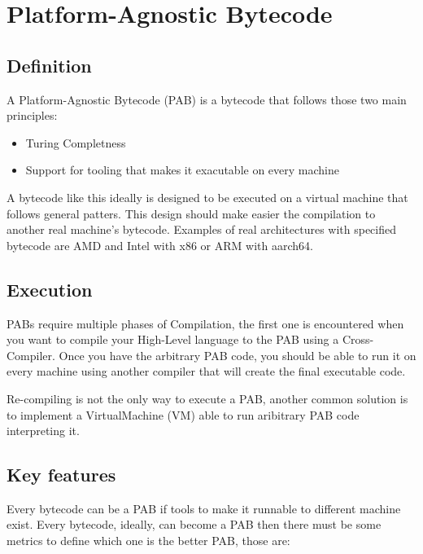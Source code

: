\documentclass[../main.tex]{subfiles}
\begin{document}
\section{Platform-Agnostic Bytecode}
\subsection{Definition}

A Platform-Agnostic Bytecode (PAB) is a bytecode that follows those two main principles:

\begin{itemize}
    \item Turing Completness
    \item Support for tooling that makes it exacutable on every machine
\end{itemize}

A bytecode like this ideally is designed to be executed on a virtual machine that follows general patters. This design should make easier the compilation to another real machine's bytecode. Examples of real architectures with specified bytecode are AMD and Intel with x86 or ARM with aarch64. %

\subsection{Execution}

PABs require multiple phases of Compilation, the first one is encountered when you want to compile your High-Level language to the PAB using a Cross-Compiler. Once you have the arbitrary PAB code, you should be able to run it on every machine using another compiler that will create the final executable code.

Re-compiling is not the only way to execute a PAB, another common solution is to implement a VirtualMachine (VM) able to run aribitrary PAB code interpreting it.

\subsection{Key features}

Every bytecode can be a PAB if tools to make it runnable to different machine exist. Every bytecode, ideally, can become a PAB then there must be some metrics to define which one is the better PAB, those are:
\end{document}
